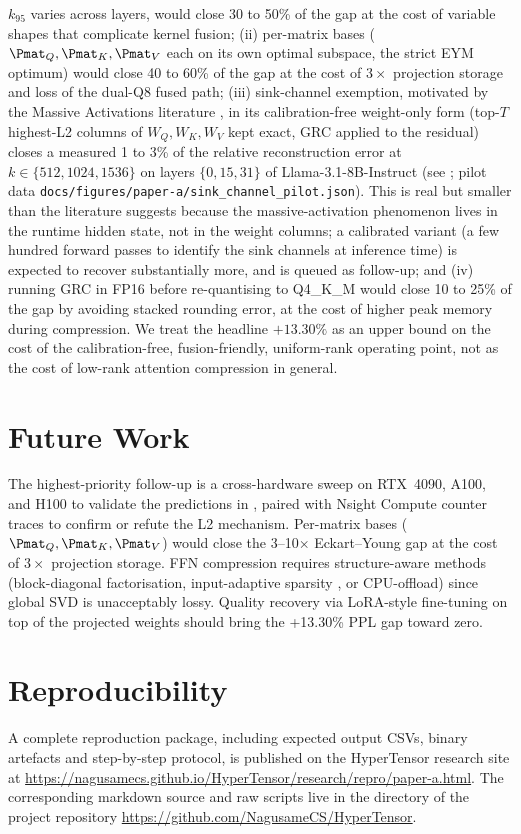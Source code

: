 \documentclass[11pt]{article}
\begin{document}
\begin{itemize}
$k_{95}$ varies across layers, would close 30 to 50\% of the gap at the
cost of variable shapes that complicate kernel fusion; (ii) per-matrix
bases ($\Pmat_Q,\Pmat_K,\Pmat_V$ each on its own optimal subspace, the
strict EYM optimum) would close 40 to 60\% of the gap at the cost of
$3\times$ projection storage and loss of the dual-Q8 fused path; (iii)
sink-channel exemption, motivated by the Massive Activations literature
\cite{sun2024massive}, in its calibration-free weight-only form
(top-$T$ highest-L2 columns of $W_Q,W_K,W_V$ kept exact, GRC applied to
the residual) closes a measured 1 to 3\% of the relative reconstruction
error at $k\in\{512,1024,1536\}$ on layers $\{0,15,31\}$ of
Llama-3.1-8B-Instruct (see ; pilot data
\texttt{docs/figures/paper-a/sink\_channel\_pilot.json}). This is real
but smaller than the literature suggests because the massive-activation
phenomenon lives in the runtime hidden state, not in the weight
columns; a calibrated variant (a few hundred forward passes to identify
the sink channels at inference time) is expected to recover
substantially more, and is queued as follow-up; and (iv) running GRC in
FP16 before re-quantising to Q4\_K\_M would close 10 to 25\% of the gap
by avoiding stacked rounding error, at the cost of higher peak memory
during compression. We treat the headline $+13.30\%$ as an upper bound
on the cost of the calibration-free, fusion-friendly, uniform-rank
operating point, not as the cost of low-rank attention compression in
general.
\end{itemize}

\section{Future Work}
\label{sec:future}
The highest-priority follow-up is a cross-hardware sweep on RTX~4090, A100,
and H100 to validate the predictions in , paired with
Nsight Compute counter traces to confirm or refute the L2 mechanism.
Per-matrix bases ($\Pmat_Q,\Pmat_K,\Pmat_V$) would close the
3--10$\times$ Eckart--Young gap at the cost of $3\times$ projection storage.
FFN compression requires structure-aware methods (block-diagonal
factorisation, input-adaptive sparsity \cite{elhage2022superposition},
or CPU-offload) since global SVD is unacceptably lossy.  Quality recovery via
LoRA-style \cite{hu2021lora} fine-tuning on top of the projected weights
should bring the +13.30\% PPL gap toward zero.

\section{Reproducibility}
A complete reproduction package, including expected output CSVs,
binary artefacts and step-by-step protocol, is published on the
HyperTensor research site at
\url{https://nagusamecs.github.io/HyperTensor/research/repro/paper-a.html}.
The corresponding markdown source and raw scripts live in the
 directory of the project repository
\url{https://github.com/NagusameCS/HyperTensor}.
\end{document}
